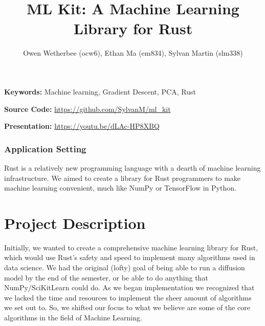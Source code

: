 \documentclass[12pt, letterpaper]{article}
\title{ML Kit: A Machine Learning Library for Rust}
\author{Owen Wetherbee (ocw6), Ethan Ma (em834), Sylvan Martin (slm338)}
\date{}
\theoremstyle{definition}
\theoremstyle{remark}
\begin{document}
\captionsetup{labelformat=empty,labelsep=none}

\maketitle

\begin{center}
    \textbf{Keywords:} Machine learning, Gradient Descent, PCA, Rust
\end{center}

\textbf{Source Code:} \url{https://github.com/SylvanM/ml_kit}

\textbf{Presentation:} \url{https://youtu.be/dLAc-HP8XBQ}

\subsubsection*{Application Setting}

Rust is a relatively new programming language with a dearth of machine learning infrastructure. We aimed to 
create a library for Rust programmers to make machine learning convenient, much like NumPy or TensorFlow in Python.

\section{Project Description}

Initially, we wanted to create a comprehensive machine learning library for Rust, which would use Rust's safety
and speed to implement many algorithms used in data science. We had the original (lofty) goal of being able to 
run a diffusion model by the end of the semester, or be able to do anything that NumPy/SciKitLearn could do. As 
we began implementation we recognized that we lacked the time and resources to implement the sheer amount of algorithms 
we set out to. So, we shifted our focus to what we believe are some of the core algorithms in the field of 
Machine Learning.
\end{document}
